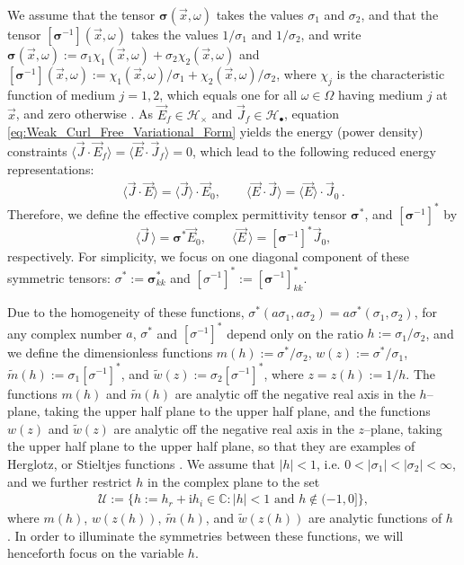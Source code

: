 \documentclass[english,12pt,jmp,graphicx]{revtex4-1}
\newcommand{\I}{\mathrm{i}}
\begin{document}
We assume that the tensor $\bm{\sigma}(\vec{x},\omega)$ takes the values $\sigma_1$
and $\sigma_2$, and that the tensor $[\bm{\sigma}^{-1}](\vec{x},\omega)$ takes the
values $1/\sigma_1$ and $1/\sigma_2$, and write 
$\bm{\sigma}(\vec{x},\omega):=\sigma_1\chi_1(\vec{x},\omega)+\sigma_2\chi_2(\vec{x},\omega)$ and
$[\bm{\sigma}^{-1}](\vec{x},\omega):=\chi_1(\vec{x},\omega)/\sigma_1+\chi_2(\vec{x},\omega)/\sigma_2$,
where $\chi_j$ is the characteristic function of medium $j=1,2$, which
equals one for all $\omega\in\Omega$ having medium $j$ at $\vec{x}$, and zero
otherwise \cite{Golden:CMP-473}. As $\vec{E}_f\in\mathscr{H}_\times$ and
$\vec{J}_f\in\mathscr{H}_{\bullet}$, equation
\eqref{eq:Weak_Curl_Free_Variational_Form}
yields the energy (power density) constraints
$\langle\vec{J}\cdot\vec{E}_f\rangle=\langle\vec{E}\cdot\vec{J}_f\rangle=0$, which lead to the
following reduced energy representations:   
%
\begin{align}\label{eq:Reduced_System_Energy_Representations}
  \langle\vec{J}\cdot\vec{E}\rangle=\langle\vec{J}\rangle\cdot\vec{E}_0, \qquad
  \langle\vec{E}\cdot\vec{J}\rangle=\langle\vec{E}\rangle\cdot\vec{J}_0\,.
\end{align}
%
Therefore, we define the effective complex permittivity
tensor $\bm{\sigma}^*$, and $[\bm{\sigma}^{-1}]^*$ by 
%
\begin{equation}\label{eq:eff_eps_def}
    \langle \vec{J} \,\rangle=  \bm{\sigma}^* \vec{E}_0,\qquad
    \langle \vec{E} \,\rangle=  [\bm{\sigma}^{-1}]^*\vec{J}_0,
\end{equation}
%
respectively. For simplicity, we focus on one diagonal component of
these symmetric tensors: $\sigma^*:=\bm{\sigma}^*_{kk}$ and
$[\sigma^{-1}]^*:=[\bm{\sigma}^{-1}]^*_{kk}$.

Due to the homogeneity of these functions,
$\sigma^*(a\sigma_1,a\sigma_2)=a\sigma^*(\sigma_1,\sigma_2)$, for any complex number $a$, $\sigma^*$ and
$[\sigma^{-1}]^*$ depend only on the ratio $h:=\sigma_1/\sigma_2$, and we define the
dimensionless functions $m(h):=\sigma^*/\sigma_2$, $w(z):=\sigma^*/\sigma_1$,
$\tilde{m}(h):=\sigma_1[\sigma^{-1}]^*$, and $\tilde{w}(z):=\sigma_2[\sigma^{-1}]^*$, where 
$z=z(h):=1/h$. The functions $m(h)$ and $\tilde{m}(h)$ are analytic off the
negative real axis in the $h$--plane, taking the upper half plane to
the upper half plane, and the functions $w(z)$ and $\tilde{w}(z)$ are
analytic off the negative real axis in the $z$--plane, taking the
upper half plane to the upper half plane, so that they are examples of
Herglotz, or Stieltjes functions \cite{Golden:CMP-473}. We assume that
$|h|<1$, i.e. $0<|\sigma_1|<|\sigma_2|<\infty$, and we further restrict $h$ in the
complex plane to the set    
%
\begin{align}\label{eq:h_Domain}
  \mathcal{U}:=\{h:=h_r+\I h_i\in\mathbb{C}: |h|<1 \text{ and } h\not\in(-1,0]\},
\end{align}
%
where $m(h)$, $w(z(h))$, $\tilde{m}(h)$, and $\tilde{w}(z(h))$ are
analytic functions of $h$ \cite{Golden:CMP-473}. In order to
illuminate the symmetries between these functions, we will henceforth
focus on the variable $h$.
\end{document}
